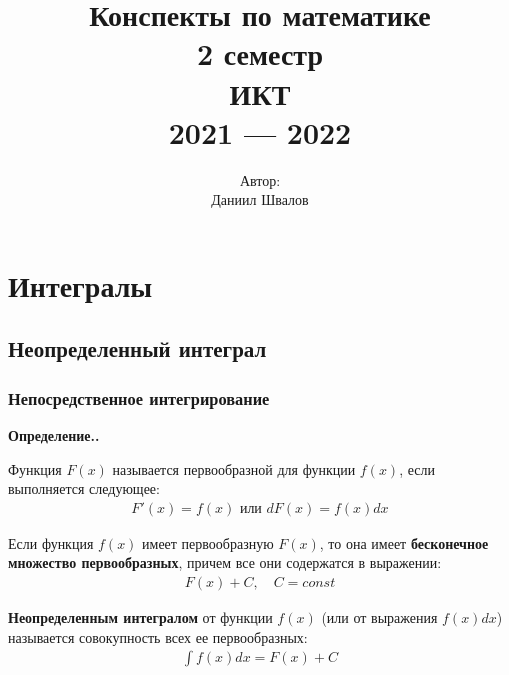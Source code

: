 \documentclass[a4paper,12pt,oneside]{extbook}
\title{
    Конспекты по математике \\
    \vspace{2cm} 2 семестр \\
    \vspace{2cm} ИКТ \\
    2021 — 2022
    \vfill
}
\author{
    Автор: \\
    Даниил Швалов
}
\date{}
\newcommand{\newpar}{$ $\par\nobreak\ignorespaces}
\newenvironment{definition}[1][]{\noindent\textbf{Определение.\if\relax\detokenize{#1}\relax\else\;#1.\fi}\newpar}{}
\theoremstyle{numbered}
\theoremstyle{unnumbered}
\theoremstyle{named}
\theoremstyle{unnumbered}
\theoremstyle{named}
\theoremstyle{named}
\theoremstyle{named}
\begin{document}
\begin{titlepage}
    \pagestyle{empty}
    \cleardoublepage
    \maketitle
    \thispagestyle{empty}
\end{titlepage}

\setcounter{page}{2}
{
    \setcounter{tocdepth}{4}
    \hypersetup{linkcolor=black}
    \tableofcontents
}

\chapter{Интегралы}%
\label{cha:Интегралы}

\section{Неопределенный интеграл}%
\label{sec:Неопределенный интеграл}

\subsection{Непосредственное интегрирование}%
\label{sub:Непосредственное интегрирование}

\begin{definition}
    Функция \(F(x)\) называется первообразной для функции \(f(x)\), если выполняется следующее:
    \begin{gather*}
        F'(x) = f(x) \text{ или } dF(x) = f(x) dx
    \end{gather*}

    Если функция \(f(x)\) имеет первообразную \(F(x)\), то она имеет \textbf{бесконечное множество первообразных}, причем все они содержатся в выражении:
    \begin{gather*}
        F(x) + C, \quad C = const
    \end{gather*}

    \textbf{Неопределенным интегралом} от функции \(f(x)\) (или от выражения \(f(x)dx\)) называется совокупность всех ее первообразных:
    \begin{gather*}
        \int f(x)dx = F(x) + C
    \end{gather*}
\end{definition}
\end{document}
